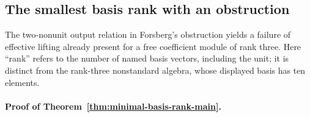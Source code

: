 \subsection{The smallest basis rank with an obstruction}\label{sec:minimal-basis-rank}
The two-nonunit output relation in Forsberg's obstruction \citep[Corollary 13]{Forsberg} yields a failure of effective lifting already present for a free coefficient module of rank three. Here ``rank'' refers to the number of named basis vectors, including the unit; it is distinct from the rank-three nonstandard algebra, whose displayed basis has ten elements.

\paragraph{Proof of Theorem~\ref{thm:minimal-basis-rank-main}.}
